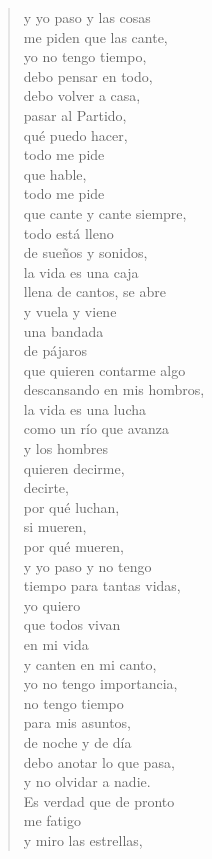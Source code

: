 \documentclass[12pt]{article}
\begin{document}
\begin{verse}
{y yo paso y las cosas\\
me piden que las cante,\\
yo no tengo tiempo,\\
debo pensar en todo,\\
debo volver a casa,\\
pasar al Partido,\\
qué puedo hacer,\\
todo me pide\\
que hable,\\
todo me pide\\
que cante y cante siempre,\\
todo está lleno\\
de sueños y sonidos,\\
la vida es una caja\\
llena de cantos, se abre\\
y vuela y viene\\
una bandada\\
de pájaros\\
que quieren contarme algo\\
descansando en mis hombros,\\
la vida es una lucha\\
como un río que avanza\\
y los hombres\\
quieren decirme,\\
decirte,\\
por qué luchan,\\
si mueren,\\
por qué mueren,\\
y yo paso y no tengo\\
tiempo para tantas vidas,\\
yo quiero\\
que todos vivan\\
en mi vida\\
y canten en mi canto,\\
yo no tengo importancia,\\
no tengo tiempo\\
para mis asuntos,\\
de noche y de día\\
debo anotar lo que pasa,\\
y no olvidar a nadie.\\
Es verdad que de pronto\\
me fatigo\\
y miro las estrellas,\\
}
\end{verse}
\end{document}
